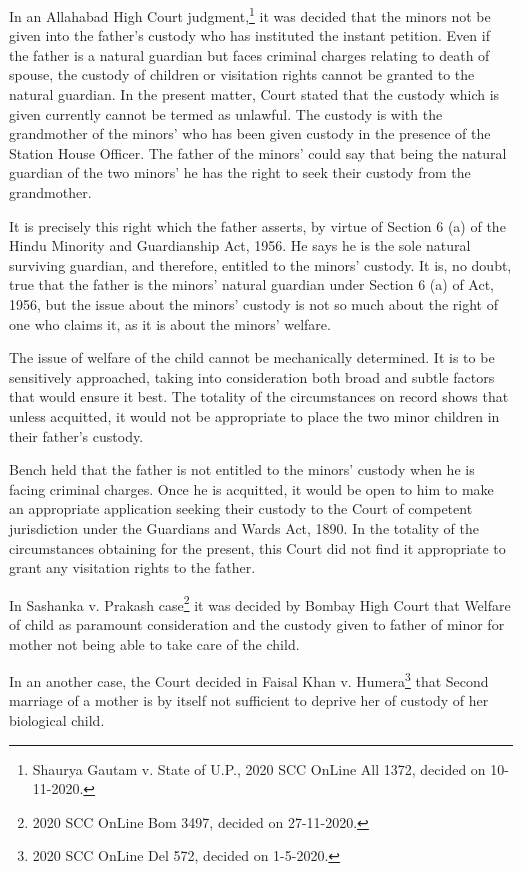 \begin{multicols}{2}
\noi
In an Allahabad High Court judgment,\footnote{Shaurya Gautam v. State of U.P., 2020 SCC OnLine All 1372, decided on 10-11-2020.} it was decided that the minors not be given into the
father’s custody who has instituted the instant petition. Even if the father is a natural guardian
but faces criminal charges relating to death of spouse, the custody of children or visitation rights
cannot be granted to the natural guardian. In the present matter, Court stated that the custody
which is given currently cannot be termed as unlawful. The custody is with the grandmother of
the minors’ who has been given custody in the presence of the Station House Officer. The father
of the minors’ could say that being the natural guardian of the two minors’ he has the right to seek
their custody from the grandmother.

\noi
It is precisely this right which the father asserts, by virtue of Section 6 (a) of the Hindu Minority
and Guardianship Act, 1956. He says he is the sole natural surviving guardian, and therefore,
entitled to the minors’ custody. It is, no doubt, true that the father is the minors’ natural guardian
under Section 6 (a) of Act, 1956, but the issue about the minors’ custody is not so much about the
right of one who claims it, as it is about the minors’ welfare.

\noi
The issue of welfare of the child cannot be mechanically determined. It is to be sensitively
approached, taking into consideration both broad and subtle factors that would ensure it best. The
totality of the circumstances on record shows that unless acquitted, it would not be appropriate to
place the two minor children in their father’s custody.

\noi
Bench held that the father is not entitled to the minors’ custody when he is facing criminal charges.
Once he is acquitted, it would be open to him to make an appropriate application seeking their
custody to the Court of competent jurisdiction under the Guardians and Wards Act, 1890. In the totality of the circumstances obtaining for the present, this Court did not find it appropriate to
grant any visitation rights to the father.

\noi
In Sashanka v. Prakash case\footnote{2020 SCC OnLine Bom 3497, decided on 27-11-2020.} it was decided by Bombay High Court that Welfare of child as
paramount consideration and the custody given to father of minor for mother not being able to
take care of the child.

\noi
In an another case, the Court decided in Faisal Khan v. Humera\footnote{2020 SCC OnLine Del 572, decided on 1-5-2020.} that Second marriage of a mother is by itself not sufficient to deprive her of custody of her biological child.


\end{multicols}
